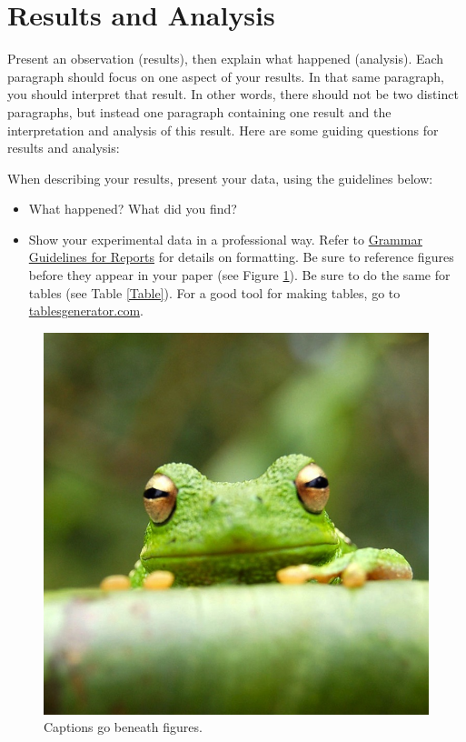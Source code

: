 \documentclass[a4paper]{article}
\begin{document}
\section* {Results and Analysis}
Present an observation (results), then explain what happened (analysis).  Each paragraph should focus on one aspect of your results. In that same paragraph, you should interpret that result.  
In other words, there should not be two distinct paragraphs, but instead one paragraph containing one result and the interpretation and analysis of this result. Here are some guiding questions for results and analysis:

When describing your results, present your data, using the guidelines below:
\begin{itemize}
\item What happened? What did you find?
\item Show your experimental data in a professional way. Refer to \href{https://confluence.cornell.edu/display/AGUACLARA/Grammar+Guidelines+for+Reports}{Grammar Guidelines for Reports} for details on formatting. Be sure to reference figures before they appear in your paper (see Figure \ref{Frog}). Be sure to do the same for tables (see Table \ref{Table}). For a good tool for making tables, go to \href{www.tablesgenerator.com}{tablesgenerator.com}.
\end{itemize}

\begin{figure}[H]
\centering
\includegraphics[scale=0.1]{frog}
\caption{Captions go beneath figures.}
\label{Frog}
\end{figure}
\end{document}

